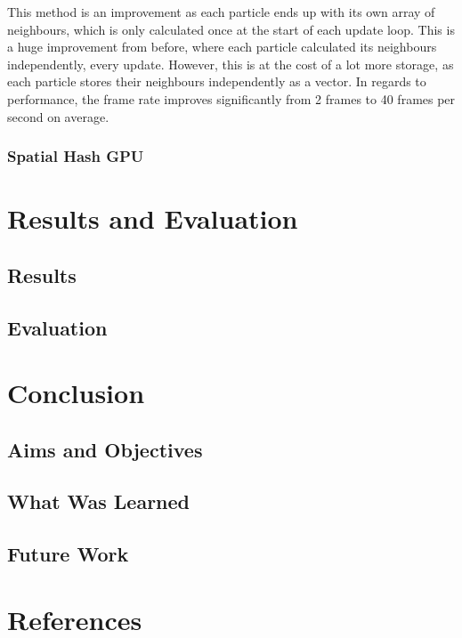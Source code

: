 \documentclass[12pt]{article}
\begin{document}
    This method is an improvement as each particle ends up with its own array of neighbours, which is only calculated once at the start of each update loop. This is a huge improvement from before, where each particle calculated its neighbours independently, every update. However, this is at the cost of a lot more storage, as each particle stores their neighbours independently as a vector. In regards to performance, the frame rate improves significantly from 2 frames to 40 frames per second on average.

    \subsubsection{Spatial Hash GPU}
    
    \newpage

    \section{Results and Evaluation}
    \label{sec:resultsandevaluation}
    \subsection{Results}
    \subsection{Evaluation}

    \newpage

    \section{Conclusion}
    \label{sec:conclusion}
    \subsection{Aims and Objectives}
    \subsection{What Was Learned}
    \subsection{Future Work}

    \newpage

    \section{References}
    \label{sec:references}
    
\end{document}

